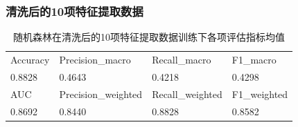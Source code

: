 \documentclass[10pt]{article}
\begin{document}
\subsubsection*{清洗后的10项特征提取数据}
\begin{table}[H]
  \centering
  \caption{随机森林在清洗后的10项特征提取数据训练下各项评估指标均值}
  \begin{tabular}{llll}
  \toprule
  Accuracy & Precision\_macro & Recall\_macro & F1\_macro \\
  0.8828 & 0.4643 & 0.4218 & 0.4298 \\
  \midrule
  AUC & Precision\_weighted & Recall\_weighted & F1\_weighted \\
  0.8692 & 0.8440 & 0.8828 & 0.8582 \\
  \bottomrule
  \end{tabular}
\end{table}
\end{document}
